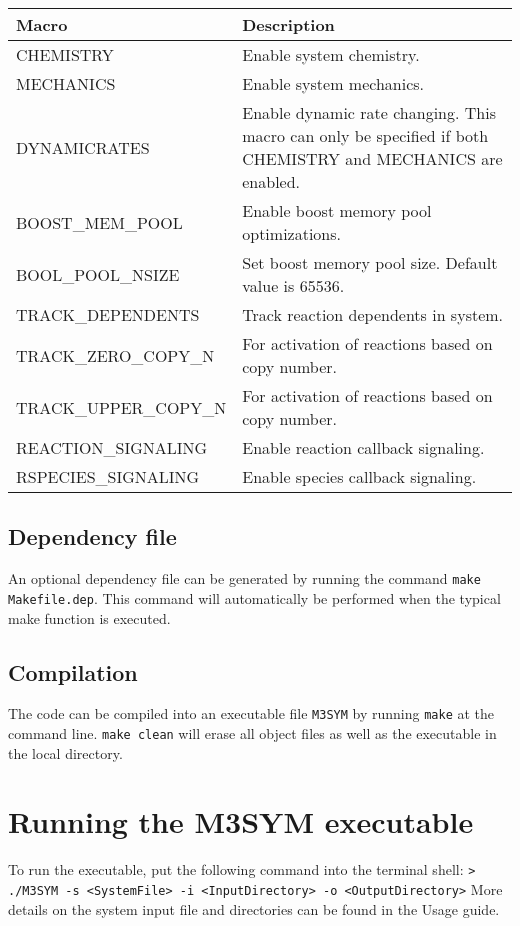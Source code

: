 \documentclass[11pt, oneside]{article}   	%
\begin{document}
\small
\begin{table} [!ht]
\centering
\begin{tabular}{|L{5cm}|L{9cm}|}  
\hline
 \textbf{Macro} & \textbf{Description} \\
 \hline
  CHEMISTRY & Enable system chemistry. \\
  \hline
  MECHANICS & Enable system mechanics. \\ 
  \hline
  DYNAMICRATES & Enable dynamic rate changing. This macro can only be specified if both CHEMISTRY and
  MECHANICS are enabled. \\
  \hline
  BOOST\_MEM\_POOL & Enable boost memory pool optimizations. \\
  \hline
   BOOL\_POOL\_NSIZE & Set boost memory pool size. Default value is 65536. \\
  \hline
   TRACK\_DEPENDENTS & Track reaction dependents in system. \\
  \hline
    TRACK\_ZERO\_COPY\_N & For activation of reactions based on copy number. \\
  \hline
     TRACK\_UPPER\_COPY\_N & For activation of reactions based on copy number. \\
  \hline
     REACTION\_SIGNALING & Enable reaction callback signaling. \\
  \hline
     RSPECIES\_SIGNALING & Enable species callback signaling.\\
  \hline
\end{tabular}
\end{table}
\normalsize

	
\subsection {Dependency file}

An optional dependency file can be generated by running the command  \texttt{make Makefile.dep}. This command will automatically be performed when the typical make function is executed.

\subsection{Compilation}

The code can be compiled into an executable file \texttt{M3SYM} by running \texttt{make} at the command line. \texttt{make clean} will erase all object files as well as the executable in the local directory.

\section {Running the M3SYM executable}

To run the executable, put the following command into the terminal shell: \newline \newline\indent \texttt{> ./M3SYM -s <SystemFile> -i <InputDirectory> -o <OutputDirectory>} \newline \newline More details on the system input file and directories can be found in the Usage guide.
\end{document}
